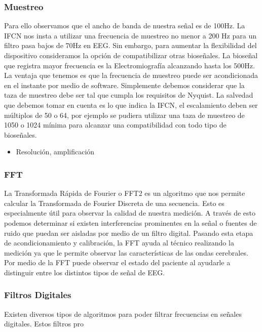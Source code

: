 \documentclass[11pt]{article}
\begin{document}
\subsubsection{Muestreo}
\label{sec:org3107a0a}
Para ello observamos que el ancho de banda de nuestra señal es de 100Hz. La IFCN nos insta a utilizar una frecuencia de muestreo no menor a 200 Hz para un filtro pasa bajos de 70Hz en EEG. Sin embargo, para aumentar la flexibilidad del dispositivo consideramos la opción de compatibilizar otras bioseñales. La bioseñal que registra mayor frecuencia es la Electromiografía alcanzando hasta los 500Hz. La ventaja que tenemos es que la frecuencia de muestreo puede ser acondicionada en el instante por medio de software. Simplemente debemos considerar que la taza de muestreo debe ser tal que cumpla los requisitos de Nyquist. La salvedad que debemos tomar en cuenta es lo que indica la IFCN, el escalamiento deben ser múltiplos de 50 o 64, por ejemplo se pudiera utilizar una taza de muestreo de 1050 o 1024 mínima para alcanzar una compatibilidad con todo tipo de bioseñales.
\begin{itemize}
\item Resolución, amplificación
\end{itemize}
\subsubsection{FFT}
\label{sec:org1c817e5}
La Transformada Rápida de Fourier o FFT2 es un algoritmo que nos permite calcular la Transformada de Fourier Discreta de una secuencia. Esto es especialmente útil para observar la calidad de nuestra medición. A través de esto podemos determinar si existen interferencias prominentes en la señal o fuentes de ruido que puedan ser aisladas por medio de un filtro digital. Pasando esta etapa de acondicionamiento y calibración, la FFT ayuda al técnico realizando la medición ya que le permite observar las características de las ondas cerebrales. Por medio de la FFT puede observar el estado del paciente al ayudarle a distinguir entre los distintos tipos de señal de EEG.

\subsubsection{Filtros Digitales}
\label{sec:orgc91546a}
Existen diversos tipos de algoritmos para poder filtrar frecuencias en señales digitales. Estos filtros pro
\end{document}
